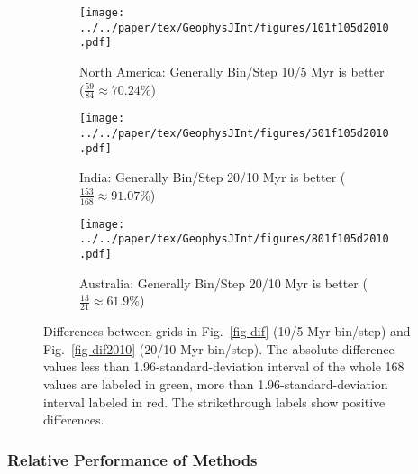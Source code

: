 \begin{figure*}
  \centering
  \begin{subfigure}{1\textwidth}
    \texttt{[image: ../../paper/tex/GeophysJInt/figures/101f105d2010.pdf]}
    \caption{North America: Generally Bin/Step 10/5 Myr is better
      ($\frac{59}{84}\approx70.24\%$)}\label{fig-101f105d2010}
  \end{subfigure}
  \vspace{.1em}
  \begin{subfigure}{1\textwidth}
    \texttt{[image: ../../paper/tex/GeophysJInt/figures/501f105d2010.pdf]}
    \caption{India: Generally Bin/Step 20/10 Myr is better
      ($\frac{153}{168}\approx91.07\%$)}\label{fig-501f105d2010}
  \end{subfigure}
  \vspace{.1em}
  \begin{subfigure}{1\textwidth}
    \texttt{[image: ../../paper/tex/GeophysJInt/figures/801f105d2010.pdf]}
    \caption{Australia: Generally Bin/Step 20/10 Myr is better
      ($\frac{13}{21}\approx61.9\%$)}\label{fig-801f105d2010}
  \end{subfigure}
  \caption[]{Differences between grids in Fig.~\ref{fig-dif} (10/5 Myr bin/step)
    and Fig.~\ref{fig-dif2010} (20/10 Myr bin/step). The absolute difference
    values less than 1.96-standard-deviation interval of the whole 168 values
    are labeled in green, more than 1.96-standard-deviation interval labeled in
    red. The strikethrough labels show positive differences.}\label{fig-f105d2010}
\end{figure*}

\subsubsection{Relative Performance of Methods}

